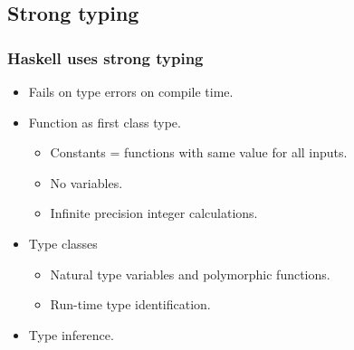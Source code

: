 \subsection{Strong typing}

\begin{frame}
  \frametitle{Haskell uses strong typing}
	\begin{itemize}
	  \item Fails on type errors on compile time.
	  \item Function as first class type.
	    \begin{itemize}
	      \item Constants = functions with same value for all inputs.
	      \item No variables.
  	      \item Infinite precision integer calculations.
	    \end{itemize}
	  \item Type classes
	    \begin{itemize}
	      \item Natural type variables and polymorphic functions.
	      \item Run-time type identification.
	    \end{itemize}  
	  \item Type inference.
	\end{itemize}
\end{frame}

